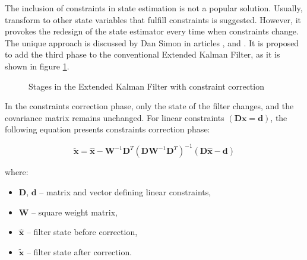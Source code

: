 The inclusion of constraints in state estimation is not a popular solution. Usually, transform to other state variables that fulfill constraints is suggested. However, it provokes the redesign of the state estimator every time when constraints change. The unique approach is discussed by Dan Simon in articles \cite{simon}, \cite{simon2010kalman} and \cite{simon2006kalman}. It is proposed to add the third phase to the conventional Extended Kalman Filter, as it is shown in figure \ref{ekf_three_phases}.

\begin{figure}[!h]
	\begin{center}
	\end{center}
	\caption{Stages in the Extended Kalman Filter with constraint correction}
	\label{ekf_three_phases}
\end{figure}

In the constraints correction phase, only the state of the filter changes, and the covariance matrix remains unchanged. For linear constraints $\left( \bm{D} \bm{x} = \bm{d}  \right)$, the following equation presents constraints correction phase:

\begin{equation}
	\bm{\tilde{x}} = \bm{\hat{x}} - \bm{W}^{-1} \bm{D}^T \left( \bm{D} \bm{W}^{-1} \bm{D}^T \right)^{-1} \left( \bm{D} \bm{\hat{x}} - \bm{d}  \right)
	\label{constraint_corr}
\end{equation}

where:
\begin{itemize}[noitemsep]
	\item $\bm{D}$, $\bm{d}$ -- matrix and vector defining linear constraints,
	\item $\bm{W}$ -- square weight matrix,
	\item $\bm{\hat{x}}$ -- filter state before correction,
	\item $\bm{\tilde{x}}$ -- filter state after correction.
\end{itemize}

